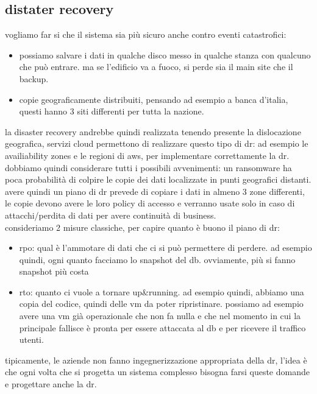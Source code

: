 \documentclass[12pt, oneside]{extbook} %
\begin{document}
\subsection{distater recovery}
vogliamo far si che il sistema sia più sicuro anche contro eventi catastrofici:
\begin{itemize}
	\item possiamo salvare i dati in qualche disco messo in qualche stanza con qualcuno che può entrare. ma se l'edificio va a fuoco, si perde sia il main site che il backup.
	\item copie geograficamente distribuiti, pensando ad esempio a banca d'italia, questi hanno 3 siti differenti per tutta la nazione.
\end{itemize}
la disaster recovery andrebbe quindi realizzata tenendo presente la dislocazione geografica, servizi cloud permettono di realizzare questo tipo di dr: ad esempio le availiability zones e le regioni di aws, per implementare correttamente la dr.\\dobbiamo quindi considerare tutti i possibili avvenimenti: un ransomware ha poca probabilità di colpire le copie dei dati localizzate in punti geografici distanti.\\avere quindi un piano di dr prevede di copiare i dati in almeno 3 zone differenti, le copie devono avere le loro policy di accesso e verranno usate solo in caso di attacchi/perdita di dati per avere continuità di business.\\consideriamo 2 misure classiche, per capire quanto è buono il piano di dr:
\begin{itemize}
	\item rpo: qual è l'ammotare di dati che ci si può permettere di perdere. ad esempio quindi, ogni quanto facciamo lo snapshot del db. ovviamente, più si fanno snapshot più costa
	\item rto: quanto ci vuole a tornare up\&running. ad esempio quindi, abbiamo una copia del codice, quindi delle vm da poter ripristinare. possiamo ad esempio avere una vm già operazionale che non fa nulla e che nel momento in cui la principale fallisce è pronta per essere attaccata al db e per ricevere il traffico utenti.
\end{itemize}
tipicamente, le aziende non fanno ingegnerizzazione appropriata della dr, l'idea è che ogni volta che si progetta un sistema complesso bisogna farsi queste domande e progettare anche la dr.
\end{document}
